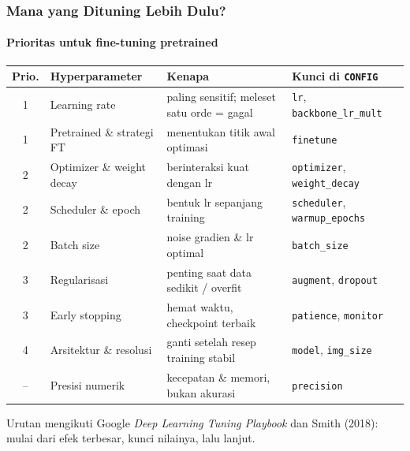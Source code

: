 \documentclass[t,aspectratio=169,xcolor={dvipsnames,table}]{beamer}
\begin{document}
\begin{frame}
    \frametitle{Mana yang Dituning Lebih Dulu?}
    \framesubtitle{Prioritas untuk fine-tuning pretrained}
    \scriptsize

    \vspace{4pt}
    \begin{center}
    \renewcommand{\arraystretch}{1.18}
    \begin{tabular}{clp{4.4cm}p{3.9cm}}
        \toprule
        \textbf{Prio.} & \textbf{Hyperparameter} & \textbf{Kenapa} & \textbf{Kunci di \texttt{CONFIG}} \\
        \midrule
        \cellcolor{dlTeal!25}1 & Learning rate & paling sensitif; meleset satu orde = gagal & \texttt{lr}, \texttt{backbone\_lr\_mult} \\
        \cellcolor{dlTeal!25}1 & Pretrained \& strategi FT & menentukan titik awal optimasi & \texttt{finetune} \\
        \cellcolor{dlTeal!12}2 & Optimizer \& weight decay & berinteraksi kuat dengan lr & \texttt{optimizer}, \texttt{weight\_decay} \\
        \cellcolor{dlTeal!12}2 & Scheduler \& epoch & bentuk lr sepanjang training & \texttt{scheduler}, \texttt{warmup\_epochs} \\
        \cellcolor{dlTeal!12}2 & Batch size & noise gradien \& lr optimal & \texttt{batch\_size} \\
        \cellcolor{dlSoftCloud}3 & Regularisasi & penting saat data sedikit / overfit & \texttt{augment}, \texttt{dropout} \\
        \cellcolor{dlSoftCloud}3 & Early stopping & hemat waktu, checkpoint terbaik & \texttt{patience}, \texttt{monitor} \\
        \cellcolor{dlSoftCloud}4 & Arsitektur \& resolusi & ganti setelah resep training stabil & \texttt{model}, \texttt{img\_size} \\
        \cellcolor{dlSoftCloud}-- & Presisi numerik & kecepatan \& memori, bukan akurasi & \texttt{precision} \\
        \bottomrule
    \end{tabular}
    \end{center}
    {\color{dlMute} Urutan mengikuti Google \textit{Deep Learning Tuning Playbook} dan Smith (2018): mulai dari efek terbesar, kunci nilainya, lalu lanjut.}
\end{frame}
\end{document}

